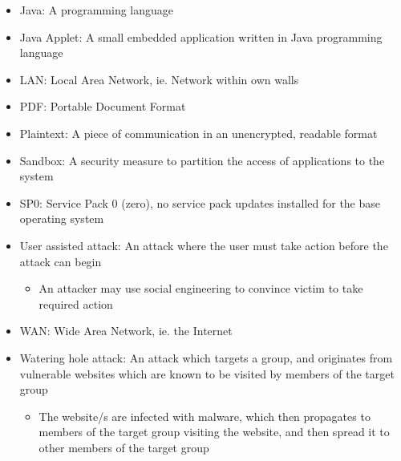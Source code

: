 \begin{itemize}
\begin{itemize}
	\end{itemize}
\item Java: A programming language
\item Java Applet: A small embedded application written in Java programming language
\item LAN: Local Area Network, ie. Network within own walls
\item PDF: Portable Document Format
\item Plaintext: A piece of communication in an unencrypted, readable format
\item Sandbox: A security measure to partition the access of applications to the system
\item SP0: Service Pack 0 (zero), no service pack updates installed for the base operating system
\item User assisted attack: An attack where the user must take action before the attack can begin
	\begin{itemize}
	\item An attacker may use social engineering to convince victim to take required action
	\end{itemize}
\item WAN: Wide Area Network, ie. the Internet
\item Watering hole attack: An attack which targets a group, and originates from vulnerable websites which are known to be visited by members of the target group \citep{Krebs2012, Mimoso2013}
	\begin{itemize}
	\item The website/s are infected with malware, which then propagates to members of the target group visiting the website, and then spread it to other members of the target group
	\end{itemize}
\end{itemize}